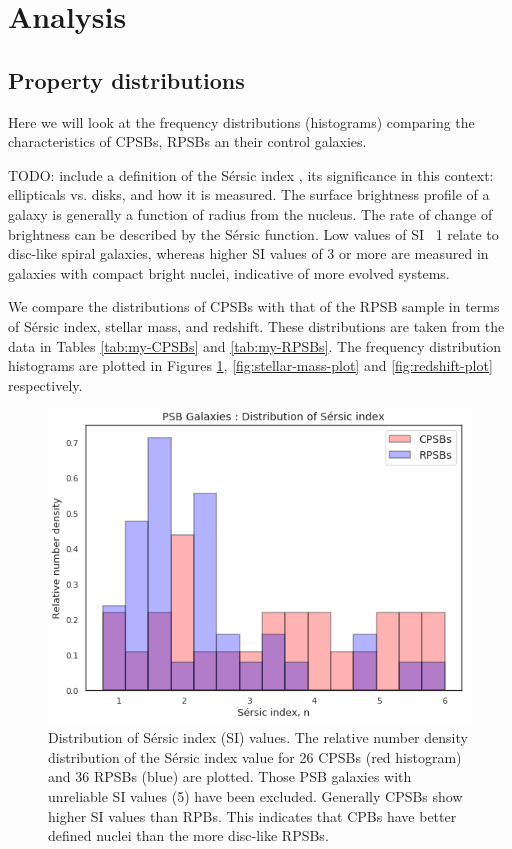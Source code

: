 \section{Analysis}
\label{sec:analysis}

\subsection{Property distributions}
Here we will look at the frequency distributions (histograms) comparing the characteristics of CPSBs, RPSBs an their control galaxies.

TODO: include a definition of the S\'ersic index \citep{1963BAAA....6...41S, 1968adga.book.....S}, its significance in this context: ellipticals vs. disks, and how it is measured. The surface brightness profile of a galaxy is generally a function of radius from the nucleus. The rate of change of brightness can be described by the S\'ersic function. Low values of SI ~1 relate to disc-like spiral galaxies, whereas higher SI values of 3 or more are measured in galaxies with compact bright nuclei, indicative of more evolved systems.  

We compare the distributions of CPSBs with that of the RPSB sample in terms of S\'ersic index, stellar mass, and redshift. These distributions are taken from the data in Tables \ref{tab:my-CPSBs} and \ref{tab:my-RPSBs}. The frequency distribution histograms are plotted in Figures \ref{fig:Sersic-plot}, \ref{fig:stellar-mass-plot} and \ref{fig:redshift-plot} respectively.

\begin{figure}
    \centering
    \includegraphics[width=\columnwidth]{images/JupyterPlots/Dist-Sersic-Index-All.png}
    \caption{Distribution of S\'ersic index (SI) values. The relative number density distribution of the S\'ersic index value for 26 CPSBs (red histogram) and 36 RPSBs (blue) are plotted. Those PSB galaxies with unreliable SI values (5) have been excluded. Generally CPSBs show higher SI values than RPBs. This indicates that CPBs have better  defined nuclei than the more disc-like RPSBs.}
    \label{fig:Sersic-plot}
\end{figure}

